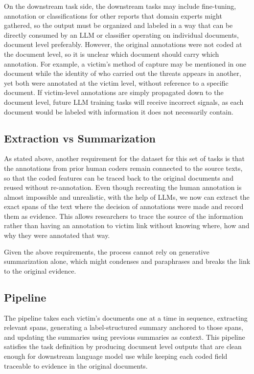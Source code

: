 \documentclass{article}
\begin{document}
On the downstream task side, the downstream tasks may include
fine-tuning, annotation or classifications for other reports that domain
experts might gathered, so the output must be organized and labeled in a
way that can be directly consumed by an LLM or classifier operating on
individual documents, document level preferably. However, the original
annotations were not coded at the document level, so it is unclear which
document should carry which annotation. For example, a victim's method
of capture may be mentioned in one document while the identity of who
carried out the threats appears in another, yet both were annotated at
the victim level, without reference to a specific document. If
victim-level annotations are simply propagated down to the document
level, future LLM training tasks will receive incorrect signals, as each
document would be labeled with information it does not necessarily
contain.

\subsection{Extraction vs
Summarization}\label{extraction-vs-summarization}

As stated above, another requirement for the dataset for this set of
tasks is that the annotations from prior human coders remain connected
to the source texts, so that the coded features can be traced back to
the original documents and reused without re-annotation. Even though
recreating the human annotation is almost impossible and unrealistic,
with the help of LLMs, we now can extract the exact spans of the text
where the decision of annotations were made and record them as evidence.
This allows researchers to trace the source of the information rather
than having an annotation to victim link without knowing where, how and
why they were annotated that way.

Given the above requirements, the process cannot rely on generative
summarization alone, which might condenses and paraphrases and breaks
the link to the original evidence.

\subsection{Pipeline}\label{pipeline}

The pipeline takes each victim's documents one at a time in sequence,
extracting relevant spans, generating a label-structured summary
anchored to those spans, and updating the summaries using previous
summaries as context. This pipeline satisfies the task definition by
producing document level outputs that are clean enough for downstream
language model use while keeping each coded field traceable to evidence
in the original documents.
\end{document}
